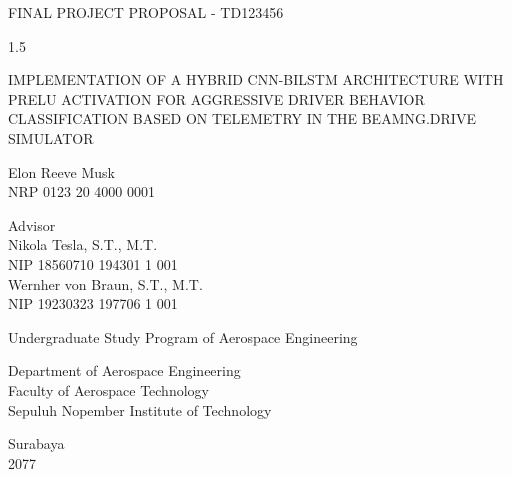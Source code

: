 \begin{large}
  FINAL PROJECT PROPOSAL - TD123456
\end{large}

\vspace{\fill}

\begin{spacing}{1.5}
  \begin{Large}
    IMPLEMENTATION OF A HYBRID CNN-BILSTM ARCHITECTURE WITH PRELU ACTIVATION FOR AGGRESSIVE DRIVER BEHAVIOR CLASSIFICATION BASED ON TELEMETRY IN THE BEAMNG.DRIVE SIMULATOR
  \end{Large}
\end{spacing}

\vspace{\fill}

\begin{large}
  Elon Reeve Musk \\
  \textmd{NRP 0123 20 4000 0001}
\end{large}

\vspace{\fill}

\begin{large}
  \textmd{Advisor} \\
  Nikola Tesla, S.T., M.T. \\
  \textmd{NIP 18560710 194301 1 001} \\
  Wernher von Braun, S.T., M.T. \\
  \textmd{NIP 19230323 197706 1 001}
\end{large}

\vspace{\fill}

Undergraduate Study Program of Aerospace Engineering \\

\mdseries

Department of Aerospace Engineering \\
Faculty of Aerospace Technology \\
Sepuluh Nopember Institute of Technology

Surabaya \\
2077

